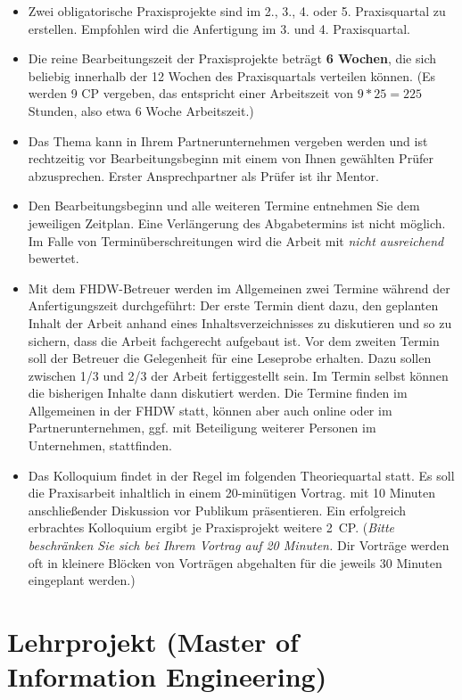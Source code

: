 \begin{itemize}
    \item Zwei obligatorische Praxisprojekte sind im 2., 3., 4. oder 5. Praxisquartal zu erstellen. Empfohlen wird die Anfertigung im 3. und 4. Praxisquartal.
    \item Die reine Bearbeitungszeit der Praxisprojekte beträgt \textbf{6 Wochen}, die sich beliebig innerhalb der 12 Wochen des Praxisquartals verteilen können. (Es werden 9 CP vergeben, das entspricht einer Arbeitszeit von $9*25=225$ Stunden, also etwa 6 Woche Arbeitszeit.)
    \item Das Thema kann in Ihrem Partnerunternehmen vergeben werden und ist rechtzeitig vor Bearbeitungsbeginn mit einem von Ihnen gewählten Prüfer abzusprechen. Erster Ansprechpartner als Prüfer ist ihr Mentor.
    \item Den Bearbeitungsbeginn und alle weiteren Termine entnehmen Sie dem jeweiligen Zeitplan. Eine Verlängerung des Abgabetermins ist nicht möglich. Im Falle von Terminüberschreitungen wird die Arbeit mit \textit{nicht ausreichend} bewertet.
    \item Mit dem FHDW-Betreuer werden im Allgemeinen zwei Termine während der Anfertigungszeit durchgeführt: Der erste Termin dient dazu, den geplanten Inhalt der Arbeit anhand eines Inhaltsverzeichnisses zu diskutieren und so zu sichern, dass die Arbeit fachgerecht aufgebaut ist. Vor dem zweiten Termin soll der Betreuer die Gelegenheit für eine Leseprobe erhalten. Dazu sollen zwischen 1/3 und 2/3 der Arbeit fertiggestellt sein. Im Termin selbst können die bisherigen Inhalte dann diskutiert werden. Die Termine finden im Allgemeinen in der FHDW statt, können aber auch online oder im Partnerunternehmen, ggf. mit Beteiligung weiterer Personen im Unternehmen, stattfinden.
    \item Das Kolloquium findet in der Regel im folgenden Theoriequartal statt. Es soll die Praxisarbeit inhaltlich in einem 20-minütigen Vortrag. mit 10 Minuten anschließender Diskussion vor Publikum präsentieren. Ein erfolgreich erbrachtes Kolloquium ergibt je Praxisprojekt weitere 2~CP. (\textit{Bitte beschränken Sie sich bei Ihrem Vortrag auf 20 Minuten.} Dir Vorträge werden oft in kleinere Blöcken von Vorträgen abgehalten für die jeweils 30 Minuten eingeplant werden.)
\end{itemize}


\section{Lehrprojekt (Master of Information Engineering)}

